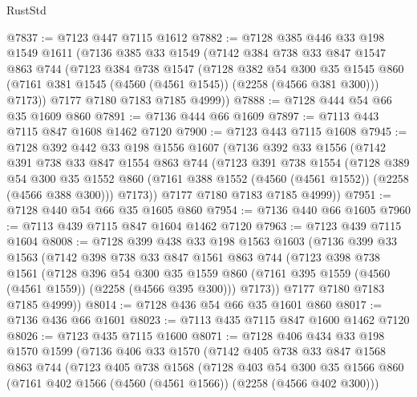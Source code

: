 \begin{lexlean}{RustStd}
\begin{coremodule}
@7837 := @7123 @447 @7115 @1612
@7882 := @7128
    @385
    @446
    @33
    @198
    @1549
    @1611
    (@7136
      @385
      @33
      @1549
      (@7142
        @384
        @738
        @33
        @847
        @1547
        @863
        @744
        (@7123
          @384
          @738
          @1547
          (@7128
            @382
            @54
            @300
            @35
            @1545
            @860
            (@7161 @381 @1545 (@4560 (@4561 @1545)) (@2258 (@4566 @381 @300)))
            @7173))
        @7177
        @7180
        @7183
        @7185
        @4999))
@7888 := @7128 @444 @54 @66 @35 @1609 @860
@7891 := @7136 @444 @66 @1609
@7897 := @7113 @443 @7115 @847 @1608 @1462 @7120
@7900 := @7123 @443 @7115 @1608
@7945 := @7128
    @392
    @442
    @33
    @198
    @1556
    @1607
    (@7136
      @392
      @33
      @1556
      (@7142
        @391
        @738
        @33
        @847
        @1554
        @863
        @744
        (@7123
          @391
          @738
          @1554
          (@7128
            @389
            @54
            @300
            @35
            @1552
            @860
            (@7161 @388 @1552 (@4560 (@4561 @1552)) (@2258 (@4566 @388 @300)))
            @7173))
        @7177
        @7180
        @7183
        @7185
        @4999))
@7951 := @7128 @440 @54 @66 @35 @1605 @860
@7954 := @7136 @440 @66 @1605
@7960 := @7113 @439 @7115 @847 @1604 @1462 @7120
@7963 := @7123 @439 @7115 @1604
@8008 := @7128
    @399
    @438
    @33
    @198
    @1563
    @1603
    (@7136
      @399
      @33
      @1563
      (@7142
        @398
        @738
        @33
        @847
        @1561
        @863
        @744
        (@7123
          @398
          @738
          @1561
          (@7128
            @396
            @54
            @300
            @35
            @1559
            @860
            (@7161 @395 @1559 (@4560 (@4561 @1559)) (@2258 (@4566 @395 @300)))
            @7173))
        @7177
        @7180
        @7183
        @7185
        @4999))
@8014 := @7128 @436 @54 @66 @35 @1601 @860
@8017 := @7136 @436 @66 @1601
@8023 := @7113 @435 @7115 @847 @1600 @1462 @7120
@8026 := @7123 @435 @7115 @1600
@8071 := @7128
    @406
    @434
    @33
    @198
    @1570
    @1599
    (@7136
      @406
      @33
      @1570
      (@7142
        @405
        @738
        @33
        @847
        @1568
        @863
        @744
        (@7123
          @405
          @738
          @1568
          (@7128
            @403
            @54
            @300
            @35
            @1566
            @860
            (@7161 @402 @1566 (@4560 (@4561 @1566)) (@2258 (@4566 @402 @300)))

\end{coremodule}
\end{lexlean}
